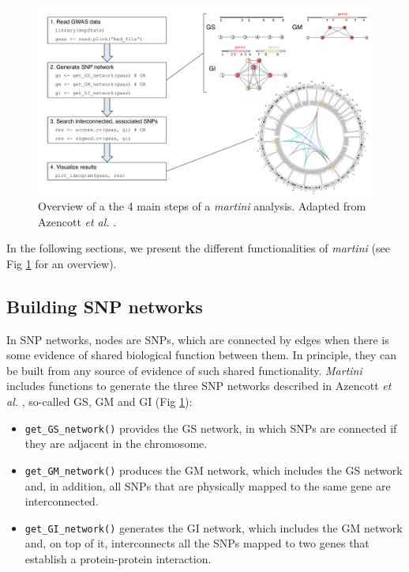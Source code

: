 \documentclass[a4paper]{article}
\begin{document}
    \begin{figure}[ht]
    \centering
    \includegraphics[width=\linewidth]{figure_1.pdf}
    \caption{Overview of a the 4 main steps of a \emph{martini} analysis. Adapted from Azencott \emph{et al.} \cite{azencottEfficientNetworkguidedMultilocus2013}.}
    \label{fig:overview}
    \end{figure}
    
    In the following sections, we present the different functionalities of \emph{martini} (see Fig \ref{fig:overview} for an overview).
    
    \subsection{Building SNP networks}
    
    In SNP networks, nodes are SNPs, which are connected by edges when there is some evidence of shared biological function between them. In principle, they can be built from any source of evidence of such shared functionality. \emph{Martini} includes functions to generate the three SNP networks described in Azencott \emph{et al.} \cite{azencottEfficientNetworkguidedMultilocus2013}, so-called GS, GM and GI (Fig \ref{fig:overview}):
    
    \begin{itemize}
    \item \texttt{get\_GS\_network()} provides the GS network, in which SNPs are connected if they are adjacent in the chromosome. 
    \item \texttt{get\_GM\_network()} produces the GM network, which includes the GS network and, in addition, all SNPs that are physically mapped to the same gene are interconnected.
    \item \texttt{get\_GI\_network()} generates the GI network, which includes the GM network and, on top of it, interconnects all the SNPs mapped to two genes that establish a protein-protein interaction.
    \end{itemize}
    
\end{document}
